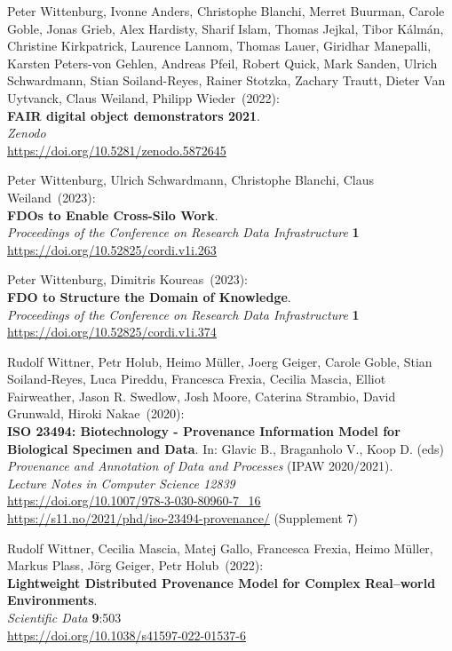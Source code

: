 \begin{thebibliography}{9}
Peter Wittenburg, Ivonne Anders, Christophe Blanchi, Merret Buurman,
Carole Goble, Jonas Grieb, Alex Hardisty, Sharif Islam, Thomas Jejkal,
Tibor Kálmán, Christine Kirkpatrick, Laurence Lannom, Thomas Lauer,
Giridhar Manepalli, Karsten Peters-von Gehlen, Andreas Pfeil, Robert
Quick, Mark Sanden, Ulrich Schwardmann, Stian Soiland-Reyes, Rainer
Stotzka, Zachary Trautt, Dieter Van Uytvanck, Claus Weiland, Philipp
Wieder~(2022): \\
\textbf{FAIR digital object demonstrators 2021}.\\
\emph{Zenodo}\\
\url{https://doi.org/10.5281/zenodo.5872645}

Peter Wittenburg, Ulrich Schwardmann, Christophe Blanchi, Claus Weiland~(2023): \\
\textbf{FDOs to Enable Cross-Silo Work}.\\
\emph{Proceedings of the Conference on Research Data Infrastructure}
\textbf{1} \\
\url{https://doi.org/10.52825/cordi.v1i.263}

Peter Wittenburg, Dimitris Koureas~(2023): \\
\textbf{FDO to Structure the Domain of Knowledge}.\\
\emph{Proceedings of the Conference on Research Data Infrastructure}
\textbf{1} \\
\url{https://doi.org/10.52825/cordi.v1i.374}

Rudolf Wittner, Petr Holub, Heimo Müller, Joerg Geiger, Carole Goble, Stian Soiland-Reyes, Luca Pireddu, Francesca Frexia, Cecilia Mascia, Elliot Fairweather, Jason R. Swedlow, Josh Moore, Caterina Strambio, David Grunwald, Hiroki Nakae~(2020): \\
\textbf{ISO 23494: Biotechnology - Provenance Information Model for Biological Specimen and Data}.
In: Glavic B., Braganholo V., Koop D. (eds) 
\emph{Provenance and Annotation of Data and Processes} (IPAW 2020/2021).\\
\emph{Lecture Notes in Computer Science 12839}\\
\url{https://doi.org/10.1007/978-3-030-80960-7_16} \\
\url{https://s11.no/2021/phd/iso-23494-provenance/}
(Supplement 7)

Rudolf Wittner, Cecilia Mascia, Matej Gallo, Francesca Frexia, Heimo Müller, Markus Plass, Jörg Geiger, Petr Holub~(2022): \\
\textbf{Lightweight Distributed Provenance Model for Complex Real--world
Environments}.\\
\emph{Scientific Data} \textbf{9}:503 \\
\url{https://doi.org/10.1038/s41597-022-01537-6}


\end{thebibliography}
